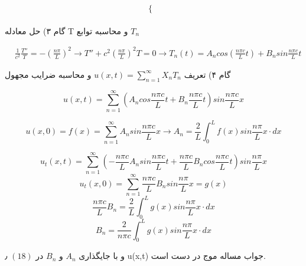 \begin{problem}
\[\begin{cases}
\end{cases}
\]
\\

گام ۳)
حل معادله T
و محاسبه توابع 
$T_n$

\begin{align*}
&\frac{1}{c^2} \frac{T''}{T} = -(\frac{n \pi}{L})^2
\rightarrow
T'' +  c^2({\frac{n \pi}{L}})^2	T = 0
 \rightarrow
T_n(t) = A_n cos (\frac{n \pi c}{L} t) + B_n sin \frac{n \pi c}{L} t
\end{align*}

گام ۴)
تعریف 
$u(x,t) = \sum_{n=1}^\infty X_n T_n$
و محاسبه ضرایب مجهول

\begin{equation}
	u(x,t) = \sum_{n=1}^\infty 
	(A_n cos \frac {n\pi c}{L}t + B_n \frac {n\pi c}{L}t) sin \frac {n\pi c}{L}x
	\label{eq:5}
\end{equation}

\begin{equation}
	u(x,0) = f(x) =‎‎\sum_{n=1}^{\infty}
	A_n sin \frac {n\pi c}{L}x
	\rightarrow A_n = \frac{2}{L} 
	\int_0^L f(x) sin \frac {n\pi}{L}x \cdot dx
\end{equation}

\begin{equation}
	u_t(x,t) = \sum_{n=1}^{\infty}
	( -\frac{n\pi c }{L} A_n sin \frac {n \pi c}{L}t + \frac {n \pi c}{L} B_n cos \frac {n \pi c}{L}t) sin \frac {n \pi }{L}x
\end{equation}
\begin{equation}
	u_t(x,0) = \sum_{n=1}^{\infty} \frac {n \pi c}{L}B_n sin\frac {n \pi}{L}x = g(x)
\end{equation}
\begin{equation}
	\frac {n \pi c}{L} B_n = \frac{2}{L} \int_0^L g(x) sin \frac {n \pi}{L}x \cdot dx
\end{equation}
\begin{equation}
	B_n = \frac{2}{n\pi c} \int_0^L g(x) sin \frac{n\pi}{L} x \cdot dx
\end{equation}

و با جایگذاری 
$A_n$
و
 $B_n$
 در 
 $(18)$
 ٫ 
 u(x,t)
 جواب مساله موج در دست است.

\end{problem}
